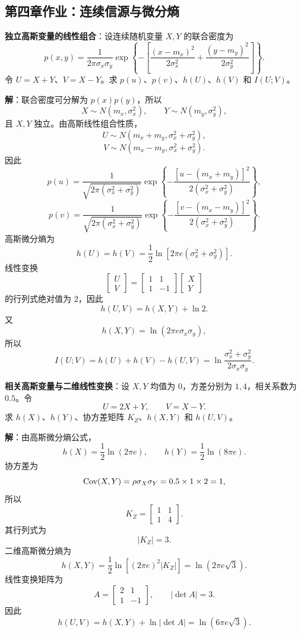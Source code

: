 \subsection{第四章作业：连续信源与微分熵}

\begin{example}
\label{hw:ch4-independent-gaussian-linear-combination}
\textbf{独立高斯变量的线性组合}：设连续随机变量 $X,Y$ 的联合密度为
\[
p(x,y)=\frac{1}{2\pi\sigma_x\sigma_y}
\exp\left\{-\left[\frac{(x-m_x)^2}{2\sigma_x^2}+\frac{(y-m_y)^2}{2\sigma_y^2}\right]\right\}.
\]
令 $U=X+Y$、$V=X-Y$。求 $p(u)$、$p(v)$、$h(U)$、$h(V)$ 和 $I(U;V)$。

\textbf{解}：联合密度可分解为 $p(x)p(y)$，所以
\[
X\sim N(m_x,\sigma_x^2),
\qquad
Y\sim N(m_y,\sigma_y^2),
\]
且 $X,Y$ 独立。由高斯线性组合性质，
\[
U\sim N(m_x+m_y,\sigma_x^2+\sigma_y^2),
\]
\[
V\sim N(m_x-m_y,\sigma_x^2+\sigma_y^2).
\]
因此
\[
p(u)=\frac{1}{\sqrt{2\pi(\sigma_x^2+\sigma_y^2)}}
\exp\left\{-\frac{[u-(m_x+m_y)]^2}{2(\sigma_x^2+\sigma_y^2)}\right\},
\]
\[
p(v)=\frac{1}{\sqrt{2\pi(\sigma_x^2+\sigma_y^2)}}
\exp\left\{-\frac{[v-(m_x-m_y)]^2}{2(\sigma_x^2+\sigma_y^2)}\right\}.
\]
高斯微分熵为
\[
h(U)=h(V)=\frac12\ln\left[2\pi e(\sigma_x^2+\sigma_y^2)\right].
\]
线性变换
\[
\begin{bmatrix}U\\V\end{bmatrix}
=
\begin{bmatrix}1&1\\1&-1\end{bmatrix}
\begin{bmatrix}X\\Y\end{bmatrix}
\]
的行列式绝对值为 $2$，因此
\[
h(U,V)=h(X,Y)+\ln2.
\]
又
\[
h(X,Y)=\ln(2\pi e\sigma_x\sigma_y),
\]
所以
\[
I(U;V)=h(U)+h(V)-h(U,V)
=\ln\frac{\sigma_x^2+\sigma_y^2}{2\sigma_x\sigma_y}.
\]
\end{example}

\begin{example}
\label{hw:ch4-correlated-gaussian-linear-transform}
\textbf{相关高斯变量与二维线性变换}：设 $X,Y$ 均值为 $0$，方差分别为 $1,4$，相关系数为 $0.5$。令
\[
U=2X+Y,
\qquad
V=X-Y.
\]
求 $h(X)$、$h(Y)$、协方差矩阵 $K_Z$、$h(X,Y)$ 和 $h(U,V)$。

\textbf{解}：由高斯微分熵公式，
\[
h(X)=\frac12\ln(2\pi e),
\qquad
h(Y)=\frac12\ln(8\pi e).
\]
协方差为
\[
\operatorname{Cov}(X,Y)=\rho\sigma_X\sigma_Y=0.5\times1\times2=1,
\]
所以
\[
K_Z=\begin{bmatrix}1&1\\1&4\end{bmatrix}.
\]
其行列式为
\[
|K_Z|=3.
\]
二维高斯微分熵为
\[
h(X,Y)=\frac12\ln\left[(2\pi e)^2|K_Z|\right]
=\ln(2\pi e\sqrt3).
\]
线性变换矩阵为
\[
A=\begin{bmatrix}2&1\\1&-1\end{bmatrix},
\qquad
|\det A|=3.
\]
因此
\[
h(U,V)=h(X,Y)+\ln|\det A|
=\ln(6\pi e\sqrt3).
\]
\end{example}

